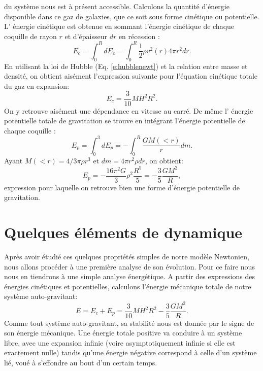  du système nous est à présent accessible. Calculons la quantité d'énergie disponible dans ce gaz de galaxies, que ce soit sous forme cinétique ou potentielle. L' énergie cinétique  est obtenue en sommant l'énergie cinétique de chaque coquille de rayon $r$ et d'épaisseur $dr$ en récession :
\begin{equation}
E_c=\int_0^R dE_c=\int_0^R \frac{1}{2}\rho  v^2(r) 4\pi r^2  dr.
\end{equation}
En utilisant la loi de Hubble (Eq. \ref{e:hubblenewt}) et la relation entre masse et densité, on obtient aisément l'expression suivante pour l'équation cinétique totale du gaz en expansion:
\begin{equation}
E_c=\frac{3}{10} M H^2 R^2.
\end{equation}
On y retrouve aisément une dépendance en vitesse au carré. De même l' énergie potentielle  totale de gravitation se trouve en intégrant l'énergie potentielle de chaque coquille :
\begin{equation}
E_p=\int_0^3 dE_p=-\int_0^R \frac{GM(<r)}{r}dm.
\end{equation}
Ayant $M(<r)=4/3\pi \rho r^3$ et $dm= 4\pi r^2 \rho dr$, on obtient:
\begin{equation}
E_p=-\frac{16 \pi^2 G}{3} \rho^2 \frac{R^5}{5}= -\frac{3}{5}\frac{GM^2}{R},
\end{equation} 
expression pour laquelle on retrouve bien une forme d'énergie potentielle de gravitation.

\section{Quelques éléments de dynamique}
Après avoir étudié ces quelques propriétés simples de notre modèle Newtonien, nous allons procéder à une première analyse de son évolution. Pour ce faire nous nous en tiendrons à une simple analyse énergétique. A partir des expressions des énergies cinétiques et potentielles, calculons l'énergie mécanique  totale de notre système auto-gravitant:
\begin{equation}
E=E_c+E_p=\frac{3}{10} M H^2 R^2 - \frac{3}{5}\frac{GM^2}{R}.
\end{equation}
Comme tout système auto-gravitant, sa stabilité nous est donnée par le signe de son énergie mécanique. Une énergie totale positive va conduire à un système libre, avec une expansion infinie (voire asymptotiquement infinie si elle est exactement nulle) tandis qu'une énergie négative correspond à celle d'un système lié, voué à s'effondre au bout d'un certain temps.

